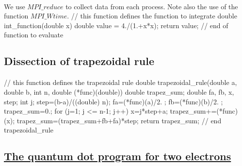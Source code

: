 \documentclass[%
oneside,                 %
final,                   %
10pt]{article}
\begin{document}
\paragraph{}

We use $MPI\_reduce$ to collect data from each process. Note also the use of the function 
$MPI\_Wtime$. 
\bcppcod
//  this function defines the function to integrate
double int_function(double x)
{
  double value = 4./(1.+x*x);
  return value;
} // end of function to evaluate

\ecppcod



\subsection{Dissection of trapezoidal rule}

\paragraph{}
\bcppcod
//  this function defines the trapezoidal rule
double trapezoidal_rule(double a, double b, int n, 
                         double (*func)(double))
{
  double trapez_sum;
  double fa, fb, x, step;
  int    j;
  step=(b-a)/((double) n);
  fa=(*func)(a)/2. ;
  fb=(*func)(b)/2. ;
  trapez_sum=0.;
  for (j=1; j <= n-1; j++){
    x=j*step+a;
    trapez_sum+=(*func)(x);
  }
  trapez_sum=(trapez_sum+fb+fa)*step;
  return trapez_sum;
}  // end trapezoidal_rule 
\ecppcod





\subsection{\href{{https://github.com/CompPhysics/ComputationalPhysics2/blob/gh-pages/doc/Programs/ParallelizationMPI/MPIvmcqdot.cpp}}{The quantum dot program for two electrons}}

\end{document}
